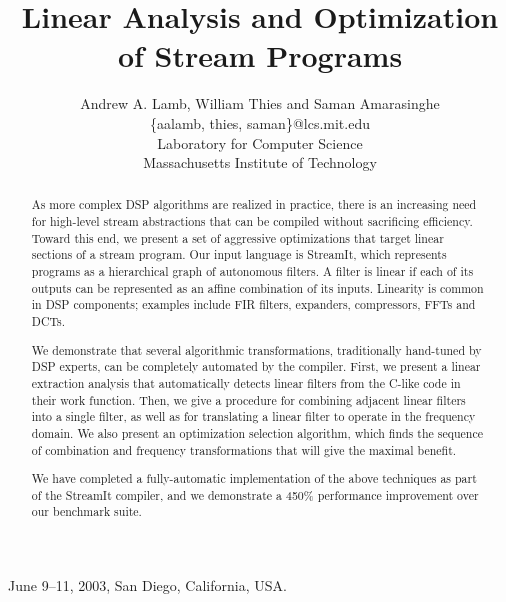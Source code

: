 \documentclass{sig-alternate}
\title{Linear Analysis and Optimization of Stream Programs}
\author{
\alignauthor \vspace{-18pt}
Andrew A. Lamb,
William Thies
and Saman Amarasinghe\\
	\vspace{8pt}
	\{aalamb, thies, saman\}@lcs.mit.edu \\
	\vspace{8pt}
	Laboratory for Computer Science \\
	Massachusetts Institute of Technology}
\begin{document}
\newtheorem{definition}{Definition}
\newtheorem{transformation}{Transformation}

 {June 9--11, 2003, San Diego, California, USA.} 

\maketitle

\newcommand{\mt}[1]{\mbox{\it #1}}
\newcommand{\todo}[1]{\framebox{\bf #1}}
\newcommand{\naive}[0]{na\"{\i}ve}
\newcommand{\Naive}[0]{Na\"{\i}ve}
\newcommand{\makeline}[0]{\rule{0cm}{0cm}\\\hrule\rule{0cm}{0cm}}

\begin{abstract}
As more complex DSP algorithms are realized in practice, there is an
increasing need for high-level stream abstractions that can be
compiled without sacrificing efficiency.  Toward this end, we present
a set of aggressive optimizations that target linear sections of a
stream program.  Our input language is StreamIt, which represents
programs as a hierarchical graph of autonomous filters.  A filter is
linear if each of its outputs can be represented as an affine
combination of its inputs.  Linearity is common in DSP components;
examples include FIR filters, expanders, compressors, FFTs and DCTs.

We demonstrate that several algorithmic transformations, traditionally
hand-tuned by DSP experts, can be completely automated by the
compiler.  First, we present a linear extraction analysis that
automatically detects linear filters from the C-like code in their
work function.  Then, we give a procedure for combining adjacent
linear filters into a single filter, as well as for translating a
linear filter to operate in the frequency domain.  We also present an
optimization selection algorithm, which finds the sequence of
combination and frequency transformations that will give the maximal
benefit.

We have completed a fully-automatic implementation of the above
techniques as part of the StreamIt compiler, and we demonstrate
a 450\% performance improvement over our benchmark suite.
\end{abstract}

\end{document}

